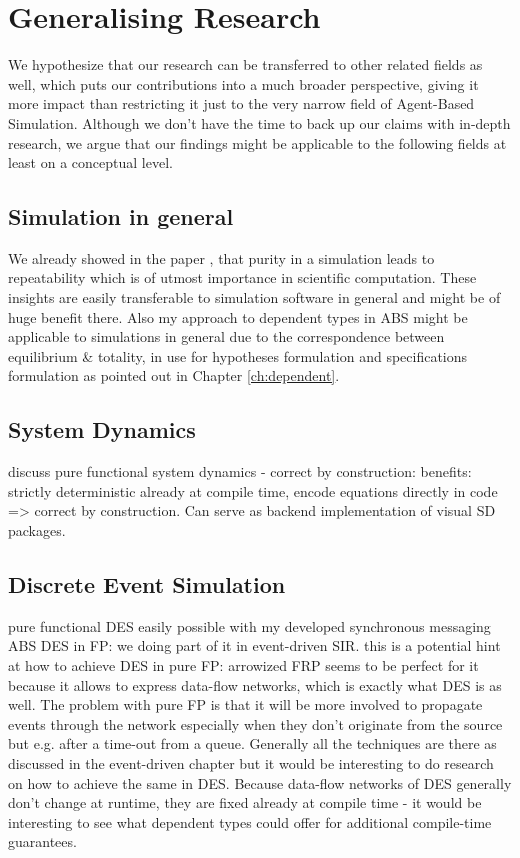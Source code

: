 \chapter{Generalising Research}
We hypothesize that our research can be transferred to other related fields as well, which puts our contributions into a much broader perspective, giving it more impact than restricting it just to the very narrow field of Agent-Based Simulation. Although we don't have the time to back up our claims with in-depth research, we argue that our findings might be applicable to the following fields at least on a conceptual level.

\section{Simulation in general}
We already showed in the paper \cite{thaler_pure_2019}, that purity in a simulation leads to repeatability which is of utmost importance in scientific computation. These insights are easily transferable to simulation software in general and might be of huge benefit there. Also my approach to dependent types in ABS might be applicable to simulations in general due to the correspondence between equilibrium \& totality, in use for hypotheses formulation and specifications formulation as pointed out in Chapter \ref{ch:dependent}. 

\section{System Dynamics}
\label{sub:generalising_system_dynamics}
discuss pure functional system dynamics - correct by construction: benefits: strictly deterministic already at compile time, encode equations directly in code => correct by construction. Can serve as backend implementation of visual SD packages.

\section{Discrete Event Simulation}
pure functional DES easily possible with my developed synchronous messaging ABS
DES in FP: we doing part of it in event-driven SIR. this is a potential hint at how to achieve DES in pure FP: arrowized FRP seems to be perfect for it because it allows to express data-flow networks, which is exactly what DES is as well. The problem with pure FP is that it will be more involved to propagate events through the network especially when they don't originate from the source but e.g. after a time-out from a queue. Generally all the techniques are there as discussed in the event-driven chapter but it would be interesting to do research on how to achieve the same in DES. Because data-flow networks of DES generally don't change at runtime, they are fixed already at compile time - it would be interesting to see what dependent types could offer for additional compile-time guarantees.

